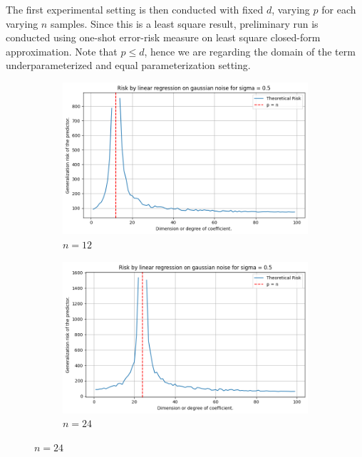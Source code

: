 \documentclass{article}
\begin{document}
The first experimental setting is then conducted with fixed $d$, varying $p$ for each varying $n$ samples. Since this is a least square result, preliminary run is conducted using one-shot error-risk measure on least square closed-form approximation. Note that $p\leq d$, hence we are regarding the domain of the term underparameterized and equal parameterization setting. 

\begin{figure}[htb]
  \centering
  \newcommand{\imgwidth}{0.22\textwidth}

  \begin{subfigure}[b]{\imgwidth}
    \includegraphics[width=\linewidth]{img/descent_lin_reg_1.png}
    \caption{$n=12$}\label{fig:1a}
  \end{subfigure}%
  \hfill
  \begin{subfigure}[b]{\imgwidth}
    \includegraphics[width=\linewidth]{img/descent_lin_reg_2.png}
    \caption{$n=24$}\label{fig:1b}
  \end{subfigure}%

\end{figure}
\end{document}
